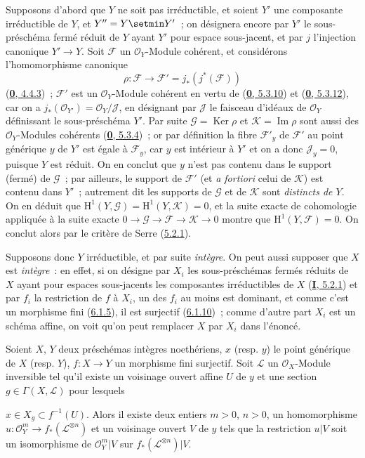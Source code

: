 Supposons d'abord que $Y$ ne soit pas irréductible, et soient $Y'$ une
composante irréductible de $Y$, et $Y''=Y\setmin Y'$~; on désignera encore par
$Y'$ le sous-préschéma fermé réduit de $Y$ ayant $Y'$ pour espace
sous-jacent, et par $j$ l'injection canonique $Y'\to Y$. Soit $\mathcal{F}$
un $\mathcal{O}_Y$-Module cohérent, et considérons l'homomorphisme canonique
\[
\rho:\mathcal{F}\longrightarrow
\mathcal{F}'=j_*(j^*(\mathcal{F}))
\]
(\hyperref[0.4.4.3-fr]{\textbf{0}, 4.4.3})~; $\mathcal{F}'$ est un
$\mathcal{O}_Y$-Module cohérent en vertu de
(\hyperref[0.5.3.10-fr]{\textbf{0}, 5.3.10}) et
(\hyperref[0.5.3.12-fr]{\textbf{0}, 5.3.12}), car on a
$j_*(\mathcal{O}_{Y'})=\mathcal{O}_Y/\mathcal{J}$, en désignant par
$\mathcal{J}$ le faisceau d'idéaux de $\mathcal{O}_Y$ définissant le
sous-préschéma $Y'$. Par suite $\mathcal{G}=\operatorname{Ker}\rho$ et
$\mathcal{K}=\operatorname{Im}\rho$ sont aussi des $\mathcal{O}_Y$-Modules
cohérents (\hyperref[0.5.3.4-fr]{\textbf{0}, 5.3.4})~; or par définition la fibre
$\mathcal{F}'_y$ de $\mathcal{F}'$ au point générique $y$ de $Y'$ est égale
à $\mathcal{F}_y$, car $y$ est intérieur à $Y'$ et on a donc
$\mathcal{J}_y=0$, puisque $Y$ est réduit. On en conclut que $y$ n'est pas
contenu dans le support (fermé) de $\mathcal{G}$~; par ailleurs, le support de
$\mathcal{F}'$ (et \emph{a fortiori} celui de $\mathcal{K}$) est contenu
dans $Y'$~; autrement dit les supports de $\mathcal{G}$ et de $\mathcal{K}$
sont \emph{distincts de $Y$}. On en déduit que
$\mathrm{H}^1(Y,\mathcal{G})=\mathrm{H}^1(Y,\mathcal{K})=0$, et la suite
exacte de cohomologie appliquée à la suite exacte
$0\to\mathcal{G}\to\mathcal{F}\to\mathcal{K}\to0$ montre que
$\mathrm{H}^1(Y,\mathcal{F})=0$. On conclut alors par le critère de Serre
(\hyperref[II.5.2.1-fr]{5.2.1}).

Supposons donc $Y$ irréductible, et par suite \emph{intègre}. On peut aussi
supposer que $X$ est \emph{intègre}~: en effet, si on désigne par $X_i$ les
sous-préschémas fermés réduits de $X$ ayant pour espaces sous-jacents les
composantes irréductibles de $X$ (\hyperref[I.5.2.1-fr]{\textbf{I}, 5.2.1}) et par
$f_i$ la restriction de $f$ à $X_i$, un des $f_i$ au moins est dominant, et
comme c'est un morphisme fini (\hyperref[II.6.1.5-fr]{6.1.5}), il est
surjectif (\hyperref[II.6.1.10-fr]{6.1.10})~; comme d'autre part $X_i$ est un
schéma affine, on voit qu'on peut remplacer $X$ par $X_i$ dans l'énoncé.

\begin{lemma}[6.7.1.1]
\label{II.6.7.1.1-fr}
Soient $X$, $Y$ deux préschémas intègres noethériens, $x$ \textup{(resp. $y$)} le
point générique de $X$ \textup{(resp. $Y$)}, $f:X\to Y$ un morphisme fini surjectif.
Soit $\mathcal{L}$ un $\mathcal{O}_X$-Module inversible tel qu'il existe un
voisinage ouvert affine $U$ de $y$ et une section
$g\in\Gamma(X,\mathcal{L})$ pour lesquels


$x\in X_g\subset f^{-1}(U)$. Alors il existe deux entiers $m>0$, $n>0$, un
homomorphisme
$u:\mathcal{O}_Y^m\to f_*(\mathcal{L}^{\otimes n})$ et un voisinage ouvert
$V$ de $y$ tels que la restriction $u|V$ soit un isomorphisme de
$\mathcal{O}_Y^m|V$ sur $f_*(\mathcal{L}^{\otimes n})|V$.
\end{lemma}

